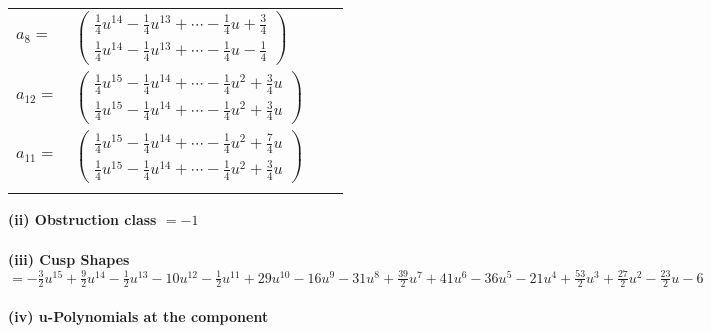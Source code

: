 \documentclass[1p]{elsarticle_modified}
\theoremstyle{definition}
\begin{document}
\begin{tabular}{m{7pt} m{180pt} m{7pt} m{180pt} }
\flushright $a_{8}=$&$\begin{pmatrix}\frac{1}{4} u^{14}-\frac{1}{4} u^{13}+\cdots-\frac{1}{4} u+\frac{3}{4}\\\frac{1}{4} u^{14}-\frac{1}{4} u^{13}+\cdots-\frac{1}{4} u-\frac{1}{4}\end{pmatrix}$ \\
\flushright $a_{12}=$&$\begin{pmatrix}\frac{1}{4} u^{15}-\frac{1}{4} u^{14}+\cdots-\frac{1}{4} u^2+\frac{3}{4} u\\\frac{1}{4} u^{15}-\frac{1}{4} u^{14}+\cdots-\frac{1}{4} u^2+\frac{3}{4} u\end{pmatrix}$ \\
\flushright $a_{11}=$&$\begin{pmatrix}\frac{1}{4} u^{15}-\frac{1}{4} u^{14}+\cdots-\frac{1}{4} u^2+\frac{7}{4} u\\\frac{1}{4} u^{15}-\frac{1}{4} u^{14}+\cdots-\frac{1}{4} u^2+\frac{3}{4} u\end{pmatrix}$\\&\end{tabular}
\flushleft \textbf{(ii) Obstruction class $= -1$}\\~\\
\flushleft \textbf{(iii) Cusp Shapes $= -\frac{3}{2} u^{15}+\frac{9}{2} u^{14}-\frac{1}{2} u^{13}-10 u^{12}-\frac{1}{2} u^{11}+29 u^{10}-16 u^9-31 u^8+\frac{39}{2} u^7+41 u^6-36 u^5-21 u^4+\frac{53}{2} u^3+\frac{27}{2} u^2-\frac{23}{2} u-6$}\\~\\
\newpage\renewcommand{\arraystretch}{1}
\flushleft \textbf{(iv) u-Polynomials at the component}\newline \\
\end{document}
